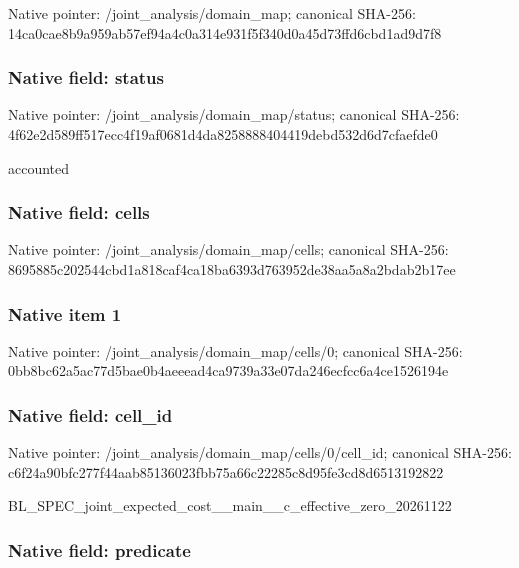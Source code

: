 \documentclass[10pt,a4paper]{article}
\begin{document}
Native pointer: /joint\_analysis/domain\_map; canonical SHA-256: 14ca0cae8b9a959ab57ef94a\allowbreak{}4c0a314e931f5f340d0a45d7\allowbreak{}3ffd6cbd1ad9d7f8



\subsubsection{Native field: status}


Native pointer: /joint\_analysis/domain\_map/status; canonical SHA-256: 4f62e2d589ff517ecc4f19af\allowbreak{}0681d4da8258888404419deb\allowbreak{}d532d6d7cfaefde0


accounted


\subsubsection{Native field: cells}


Native pointer: /joint\_analysis/domain\_map/cells; canonical SHA-256: 8695885c202544cbd1a818ca\allowbreak{}f4ca18ba6393d763952de38a\allowbreak{}a5a8a2bdab2b17ee



\subsubsection{Native item 1}


Native pointer: /joint\_analysis/domain\_map/cells/0; canonical SHA-256: 0bb8bc62a5ac77d5bae0b4ae\allowbreak{}eead4ca9739a33e07da246ec\allowbreak{}fcc6a4ce1526194e



\subsubsection{Native field: cell\_id}


Native pointer: /joint\_analysis/domain\_m\allowbreak{}ap/cells/0/cell\_id; canonical SHA-256: c6f24a90bfc277f44aab8513\allowbreak{}6023fbb75a66c22285c8d95f\allowbreak{}e3cd8d6513192822


BL\_SPEC\_joint\_expected\_c\allowbreak{}ost\_\_main\_\_c\_effective\_z\allowbreak{}ero\_20261122


\subsubsection{Native field: predicate}
\end{document}
